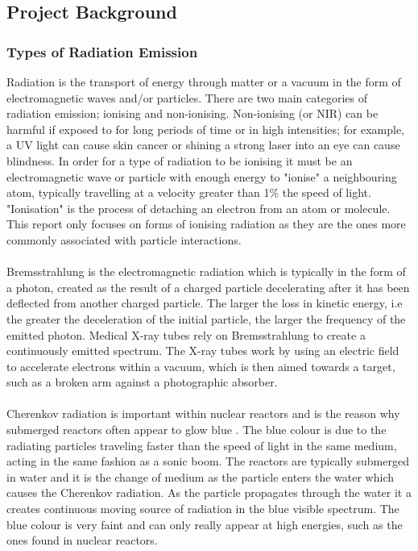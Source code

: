 \documentclass[12pt,a4paper]{article}
\begin{document}
\subsection{Project Background}
\label{back}


\subsubsection{Types of Radiation Emission }
\label{radd}
Radiation is the transport of energy through matter or a vacuum in the form of electromagnetic waves and/or particles. There are two main categories of radiation emission; ionising and non-ionising. Non-ionising (or NIR) can be harmful if exposed to for long periods of time or in high intensities; for example, a UV light can cause skin cancer or shining a strong laser into an eye can cause blindness. In order for a type of radiation to be ionising it must be an electromagnetic wave or particle with enough energy to "ionise" a neighbouring atom, typically travelling at a velocity greater than 1\% the speed of light.  "Ionisation" is the process of detaching an electron from an atom or molecule. This report only focuses on forms of ionising radiation as they are the ones more commonly associated with particle interactions. 
\\\\ 
\noindent Bremsstrahlung is the electromagnetic radiation which is typically in the form of a photon, created as the result of a charged particle decelerating after it has been deflected from another charged particle. The larger the loss in kinetic energy, i.e the greater the deceleration of the initial particle, the larger the frequency of the emitted photon. Medical X-ray tubes rely on Bremsstrahlung to create a continuously emitted spectrum. The X-ray tubes work by using an electric field to accelerate electrons within a vacuum, which is then aimed towards a target, such as a broken arm against a photographic absorber.
\\\\
\noindent Cherenkov radiation is important within nuclear reactors and is the reason why submerged reactors often appear to glow blue \cite{blue}. The blue colour is due to the radiating particles traveling faster than the speed of light in the same medium, acting in the same fashion as a sonic boom. The reactors are typically submerged in water and it is the change of medium as the particle enters the water which causes the Cherenkov radiation. As the particle propagates through the water it a creates continuous moving source of radiation in the blue visible spectrum. The blue colour is very faint and can only really appear at high energies, such as the ones found in nuclear reactors. 
 
\end{document}
